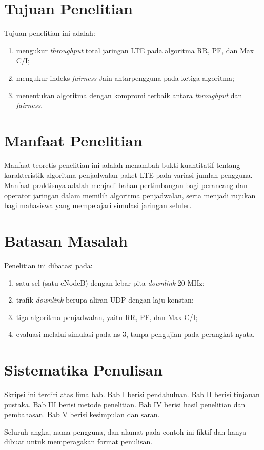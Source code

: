 \section{Tujuan Penelitian}
Tujuan penelitian ini adalah:
\begin{enumerate}
\item mengukur \textit{throughput} total jaringan LTE pada algoritma RR, PF, dan Max C/I;
\item mengukur indeks \textit{fairness} Jain antarpengguna pada ketiga algoritma;
\item menentukan algoritma dengan kompromi terbaik antara \textit{throughput} dan \textit{fairness}.
\end{enumerate}

\section{Manfaat Penelitian}
Manfaat teoretis penelitian ini adalah menambah bukti kuantitatif tentang karakteristik algoritma penjadwalan paket LTE pada variasi jumlah pengguna. Manfaat praktisnya adalah menjadi bahan pertimbangan bagi perancang dan operator jaringan dalam memilih algoritma penjadwalan, serta menjadi rujukan bagi mahasiswa yang mempelajari simulasi jaringan seluler.

\section{Batasan Masalah}
Penelitian ini dibatasi pada:
\begin{enumerate}
\item satu sel (satu eNodeB) dengan lebar pita \textit{downlink} 20 MHz;
\item trafik \textit{downlink} berupa aliran UDP dengan laju konstan;
\item tiga algoritma penjadwalan, yaitu RR, PF, dan Max C/I;
\item evaluasi melalui simulasi pada ns-3, tanpa pengujian pada perangkat nyata.
\end{enumerate}

\section{Sistematika Penulisan}
Skripsi ini terdiri atas lima bab. Bab I berisi pendahuluan. Bab II berisi tinjauan pustaka. Bab III berisi metode penelitian. Bab IV berisi hasil penelitian dan pembahasan. Bab V berisi kesimpulan dan saran.

Seluruh angka, nama pengguna, dan alamat pada contoh ini fiktif dan hanya dibuat untuk memperagakan format penulisan.

